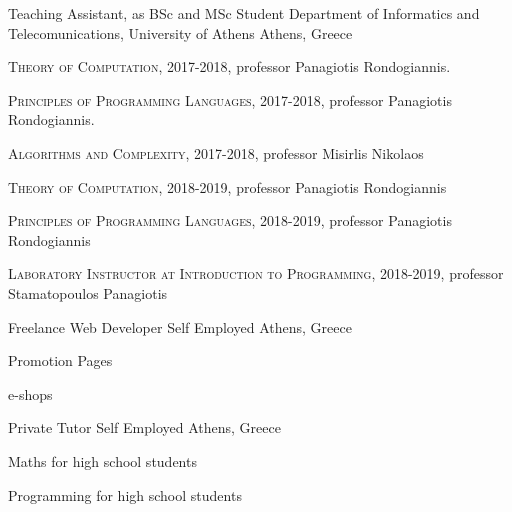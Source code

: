 \begin{cventries}
  \cventry
    {Teaching Assistant, as BSc and MSc Student} %
    {Department of Informatics and Telecomunications, University of Athens} %
    {Athens, Greece} %
    {} %
    {
      \begin{cvitems} %
        \item {{\fontsize{8pt}{1em}\bodyfont\scshape Theory of Computation}, 2017-2018, professor Panagiotis Rondogiannis.}
        \item {{\fontsize{8pt}{1em}\bodyfont\scshape Principles of Programming Languages}, 2017-2018, professor Panagiotis Rondogiannis.}
        \item {{\fontsize{8pt}{1em}\bodyfont\scshape Algorithms and Complexity}, 2017-2018, professor Misirlis Nikolaos      }
        \item {{\fontsize{8pt}{1em}\bodyfont\scshape Theory of Computation}, 2018-2019, professor Panagiotis Rondogiannis
        }
        \item {{\fontsize{8pt}{1em}\bodyfont\scshape Principles of Programming Languages}, 2018-2019, professor Panagiotis Rondogiannis
        }
	    \item {{\fontsize{8pt}{1em}\bodyfont\scshape Laboratory Instructor at Introduction to Programming}, 2018-2019, professor Stamatopoulos Panagiotis
	    }
      \end{cvitems}
    }



\cventry
{Freelance Web Developer} %
{Self Employed} %
{Athens, Greece} %
{} %
{
	\begin{cvitems} %
		\item {Promotion Pages}
		\item {e-shops}
	\end{cvitems}	
}


\cventry
{Private Tutor} %
{Self Employed} %
{Athens, Greece} %
{} %
{
	\begin{cvitems} %
		\item Maths for high school students
		\item Programming for high school students
	\end{cvitems}	
}

\end{cventries}




